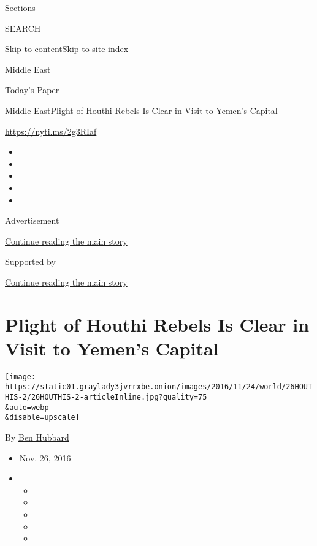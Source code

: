 Sections

SEARCH

\protect\hyperlink{site-content}{Skip to
content}\protect\hyperlink{site-index}{Skip to site index}

\href{https://www.nytimes3xbfgragh.onion/section/world/middleeast}{Middle
East}

\href{https://myaccount.nytimes3xbfgragh.onion/auth/login?response_type=cookie\&client_id=vi}{}

\href{https://www.nytimes3xbfgragh.onion/section/todayspaper}{Today's
Paper}

\href{/section/world/middleeast}{Middle East}\textbar{}Plight of Houthi
Rebels Is Clear in Visit to Yemen's Capital

\url{https://nyti.ms/2g3RIaf}

\begin{itemize}
\item
\item
\item
\item
\item
\end{itemize}

Advertisement

\protect\hyperlink{after-top}{Continue reading the main story}

Supported by

\protect\hyperlink{after-sponsor}{Continue reading the main story}

\hypertarget{plight-of-houthi-rebels-is-clear-in-visit-to-yemens-capital}{%
\section{Plight of Houthi Rebels Is Clear in Visit to Yemen's
Capital}\label{plight-of-houthi-rebels-is-clear-in-visit-to-yemens-capital}}

\texttt{[image: https://static01.graylady3jvrrxbe.onion/images/2016/11/24/world/26HOUTHIS-2/26HOUTHIS-2-articleInline.jpg?quality=75\\\&auto=webp\\\&disable=upscale]}

By \href{http://www.nytimes3xbfgragh.onion/by/ben-hubbard}{Ben Hubbard}

\begin{itemize}
\item
  Nov. 26, 2016
\item
  \begin{itemize}
  \item
  \item
  \item
  \item
  \item
  \end{itemize}
\end{itemize}

